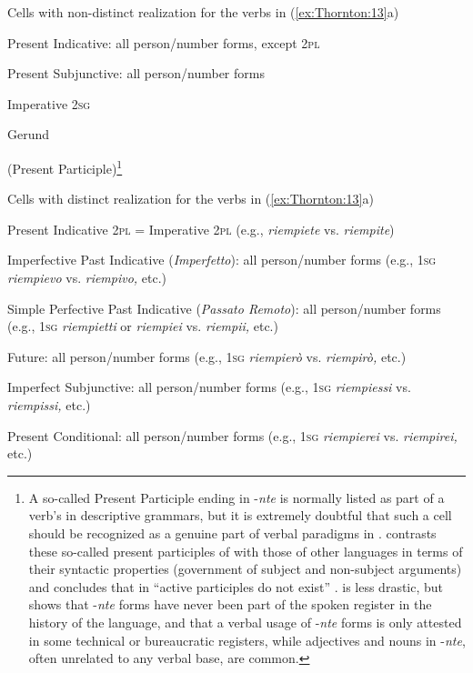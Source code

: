 \documentclass[output=paper]{langsci/langscibook}
\begin{document}
\ea\label{ex:Thornton:14a}Cells with non-distinct realization for the verbs in (\ref{ex:Thornton:13}a)

Present Indicative: all person\slash{}number forms, except \textsc{2pl}

Present Subjunctive: all person\slash{}number forms

Imperative \textsc{2sg }

Gerund

(Present Participle)\footnote{A so-called Present Participle ending in
  -\emph{nte} is normally listed as part of a verb's  in 
  descriptive grammars, but it is extremely doubtful that such a cell
  should be recognized as a genuine part of verbal paradigms in .
\citet{Haspelmath1996} %
%
contrasts these so-called present participles of
   with those of other languages in terms of their syntactic
  properties (government of subject and non-subject arguments) and
  concludes that in  ``active participles do not exist''
\citep[61]{Haspelmath1996}%
%
. %
\citet{Luraghi1999a} %
%
is less drastic, but shows that
  -\emph{nte} forms have never been part of the spoken register in the
  history of the language, and that a verbal usage of -\emph{nte} forms
  is only attested in some technical or bureaucratic registers, while
  adjectives and nouns in -\emph{nte}, often unrelated to any verbal
  base, are common.}

\ex\label{ex:Thornton:14b}Cells with distinct realization for the verbs in (\ref{ex:Thornton:13}a)

Present Indicative \textsc{2pl =} Imperative \textsc{2pl} (e.g.,
\emph{riempiete} vs. \emph{riempite})

Imperfective Past Indicative (\emph{Imperfetto}): all person\slash{}number
forms (e.g., \textsc{1sg} \emph{riempievo} vs. \emph{riempivo,} etc.)

Simple Perfective Past Indicative (\emph{Passato Remoto}): all
person\slash{}number forms (e.g., \textsc{1sg} \emph{riempietti} or
\emph{riempiei} vs. \emph{riempii,} etc.)

Future: all person\slash{}number forms (e.g., \textsc{1sg} \emph{riempierò} vs.
\emph{riempirò,} etc.)

Imperfect Subjunctive: all person\slash{}number forms (e.g., \textsc{1sg}
\emph{riempiessi} vs. \emph{riempissi,} etc.)

Present Conditional: all person\slash{}number forms (e.g., \textsc{1sg}
\emph{riempierei} vs. \emph{riempirei,} etc.)
\end{document}
